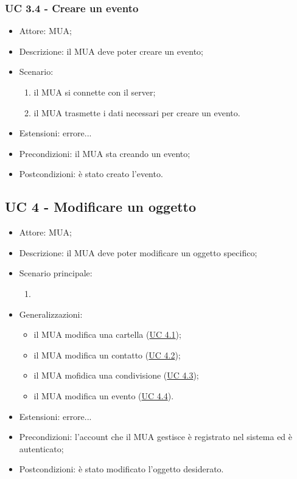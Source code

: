     \subsubsection{UC 3.4 - Creare un evento} \label{sec: UC 3.4}
    \begin{itemize}
        \item Attore: MUA;
        \item Descrizione: il MUA deve poter creare un evento;
        \item Scenario:
        \begin{enumerate}
        \item il MUA si connette con il server;
        \item il MUA trasmette i dati necessari per creare un evento.
        \end{enumerate}
        \item Estensioni: errore...
        \item Precondizioni: il MUA sta creando un evento;
        \item Postcondizioni: è stato creato l'evento.
    \end{itemize}

    \subsection{UC 4 - Modificare un oggetto} \label{sec: UC 4}
    \begin{itemize}
        \item Attore: MUA;
        \item Descrizione: il MUA deve poter modificare un oggetto specifico;
        \item Scenario principale:
            \begin{enumerate}
                \item 
            \end{enumerate}
        \item Generalizzazioni:
            \begin{itemize}
            \item il MUA modifica una cartella (\hyperref[sec: UC 4.1]{UC 4.1});
            \item il MUA modifica un contatto (\hyperref[sec: UC 4.2]{UC 4.2});
            \item il MUA mofidica una condivisione (\hyperref[sec: UC 4.3]{UC 4.3});
            \item il MUA modifica un evento (\hyperref[sec: UC 4.4]{UC 4.4}).
            \end{itemize}
        \item Estensioni: errore...
        \item Precondizioni: l’account che il MUA gestisce è registrato nel sistema ed è autenticato;
        \item Postcondizioni: è stato modificato l’oggetto desiderato.
    \end{itemize}

